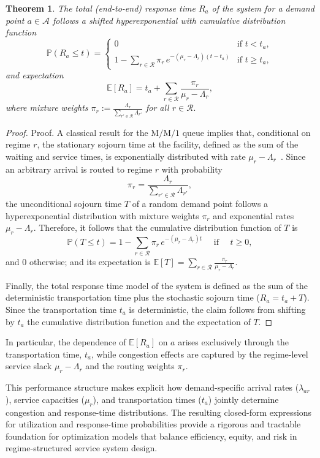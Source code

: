 \documentclass[letter,11pt, reqno]{amsart}
\newtheorem{theorem}{Theorem}
\def\A{\mathcal{A}}
\def\RR{\mathcal{R}}
\begin{document}
\begin{theorem}\label{th:hyperexponential}
The total (end-to-end) response time $R_a$ of the system for a demand point $a\in \A$ follows a shifted hyperexponential with cumulative distribution function
$$
\mathbb{P}(R_a \le t)
=
\begin{cases}
0 & \mbox{if $t < t_a$}, \\[6pt]
1-\displaystyle\sum_{r\in\mathcal{R}}
\pi_r \, e^{-(\mu_r-\Lambda_r)(t-t_a)} & \mbox{if $t \ge t_a$},
\end{cases}
$$
and expectation
$$
\mathbb{E}[R_a]
=
t_a + \sum_{r\in\mathcal{R}} \frac{\pi_r}{\mu_r-\Lambda_r},
$$
where mixture weights 
$\pi_r := \frac{\Lambda_r}{\sum_{r'\in\mathcal{R}} \Lambda_{r'}}$ for all $r\in\RR.$
\end{theorem}

\begin{proof}{Proof.}
A classical result for the $\mathrm{M}/\mathrm{M}/1$ queue implies that,
conditional on regime $r$, the stationary sojourn time at the facility, defined as the sum of the waiting and service times, is exponentially distributed with rate
$\mu_r-\Lambda_r$~\citep[see, e.g.,][]{kleinrock1975,Wolff1989}. Since an arbitrary arrival is routed to regime $r$ with probability
$$
\pi_r= \frac{\Lambda_r}{\sum_{r'\in\mathcal{R}} \Lambda_{r'}},
$$
the unconditional sojourn time $T$ of a random demand point follows a hyperexponential distribution with
mixture weights $\pi_r$ and exponential rates $\mu_r-\Lambda_r$. Therefore, it follows that the cumulative distribution function of $T$ is
$$
\mathbb{P}(T \le t)
=
1-\sum_{r\in\mathcal{R}} \pi_r \, e^{-(\mu_r-\Lambda_r)t}  \quad \text{ if }
\quad t \ge 0,
$$
and $0$ otherwise; and its expectation is $
\mathbb{E}[T]
=
\sum_{r\in\mathcal{R}} \frac{\pi_r}{\mu_r-\Lambda_r}$.

Finally, the total response time model of the system is defined as the sum of the deterministic transportation time plus the stochastic sojourn time ($R_a = t_a + T$). 
Since the transportation time $t_a$ is deterministic, the claim follows from shifting by $t_a$ the cumulative distribution
function and the expectation of $T$.%
\end{proof}

In particular, the dependence of $\mathbb{E}[R_a]$ on $a$ arises exclusively
through the transportation time, $t_a$, while congestion effects are captured by
the regime-level service slack $\mu_r-\Lambda_r$ and the routing weights $\pi_r$.

This performance structure makes explicit how demand-specific arrival rates ($\lambda_{ar}$), service capacities ($\mu_r$), and transportation times ($t_a$) jointly
determine congestion and response-time distributions. The resulting closed-form
expressions for utilization and response-time probabilities provide a rigorous and
tractable foundation for optimization models that balance efficiency, equity, and
risk in regime-structured service system design.
\end{document}
